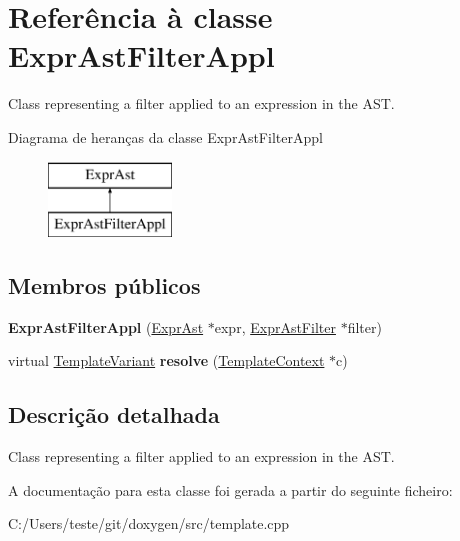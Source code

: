 \hypertarget{class_expr_ast_filter_appl}{\section{Referência à classe Expr\-Ast\-Filter\-Appl}
\label{class_expr_ast_filter_appl}
}


Class representing a filter applied to an expression in the A\-S\-T.  


Diagrama de heranças da classe Expr\-Ast\-Filter\-Appl\begin{figure}[H]
\begin{center}
\leavevmode
\includegraphics[height=2.000000cm]{class_expr_ast_filter_appl}
\end{center}
\end{figure}
\subsection*{Membros públicos}
\begin{DoxyCompactItemize}
\item 
\hypertarget{class_expr_ast_filter_appl_a303f68780b5a23698976b95ccfdcce18}{{\bfseries Expr\-Ast\-Filter\-Appl} (\hyperlink{class_expr_ast}{Expr\-Ast} $\ast$expr, \hyperlink{class_expr_ast_filter}{Expr\-Ast\-Filter} $\ast$filter)}\label{class_expr_ast_filter_appl_a303f68780b5a23698976b95ccfdcce18}

\item 
\hypertarget{class_expr_ast_filter_appl_a19e3231655a2513f6467bc2b7cf1a9ed}{virtual \hyperlink{class_template_variant}{Template\-Variant} {\bfseries resolve} (\hyperlink{class_template_context}{Template\-Context} $\ast$c)}\label{class_expr_ast_filter_appl_a19e3231655a2513f6467bc2b7cf1a9ed}

\end{DoxyCompactItemize}


\subsection{Descrição detalhada}
Class representing a filter applied to an expression in the A\-S\-T. 

A documentação para esta classe foi gerada a partir do seguinte ficheiro\-:\begin{DoxyCompactItemize}
\item 
C\-:/\-Users/teste/git/doxygen/src/template.\-cpp\end{DoxyCompactItemize}
